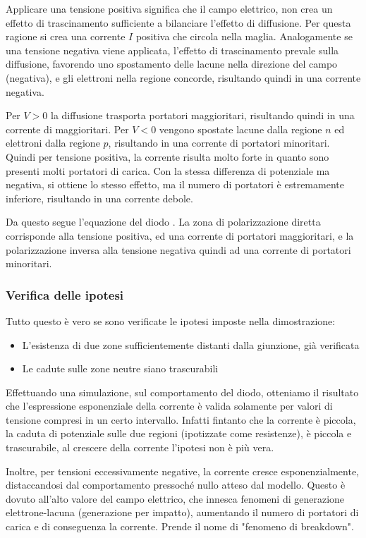 \documentclass[../template]{subfiles}
\begin{document}
Applicare una tensione positiva significa che il campo elettrico, non crea un effetto di trascinamento sufficiente a bilanciare l'effetto di diffusione. Per questa ragione si crea una corrente $I$ positiva che circola nella maglia.
Analogamente se una tensione negativa viene applicata, l'effetto di trascinamento prevale sulla diffusione, favorendo uno spostamento delle lacune nella direzione del campo (negativa), e gli elettroni nella regione concorde, risultando quindi in una corrente negativa.

Per $V > 0$ la diffusione trasporta portatori maggioritari, risultando quindi in una corrente di maggioritari. Per $V < 0$ vengono spostate lacune dalla regione $n$ ed elettroni dalla regione $p$, risultando in una corrente di portatori minoritari.
Quindi per tensione positiva, la corrente risulta molto forte in quanto sono presenti molti portatori di carica. Con la stessa differenza di potenziale ma negativa, si ottiene lo stesso effetto, ma il numero di portatori è estremamente inferiore, risultando in una corrente debole.

Da questo segue l'equazione del diodo . La zona di polarizzazione diretta corrisponde alla tensione positiva, ed una corrente di portatori maggioritari, e la polarizzazione inversa alla tensione negativa quindi ad una corrente di portatori minoritari.

\subsubsection{Verifica delle ipotesi}
Tutto questo è vero se sono verificate le ipotesi imposte nella dimostrazione:
\begin{itemize}
    \item L'esistenza di due zone sufficientemente distanti dalla giunzione, già verificata
    \item Le cadute sulle zone neutre siano trascurabili
\end{itemize}

Effettuando una simulazione, sul comportamento del diodo, otteniamo il risultato che l'espressione esponenziale della corrente è valida solamente per valori di tensione compresi in un certo intervallo. Infatti fintanto che la corrente è piccola, la caduta di potenziale sulle due regioni (ipotizzate come resistenze), è piccola e trascurabile, al crescere della corrente l'ipotesi non è più vera.

Inoltre, per tensioni eccessivamente negative, la corrente cresce esponenzialmente, distaccandosi dal comportamento pressoché nullo atteso dal modello. Questo è dovuto all'alto valore del campo elettrico, che innesca fenomeni di generazione elettrone-lacuna (generazione per impatto), aumentando il numero di portatori di carica e di conseguenza la corrente. Prende il nome di "fenomeno di breakdown".
\end{document}
